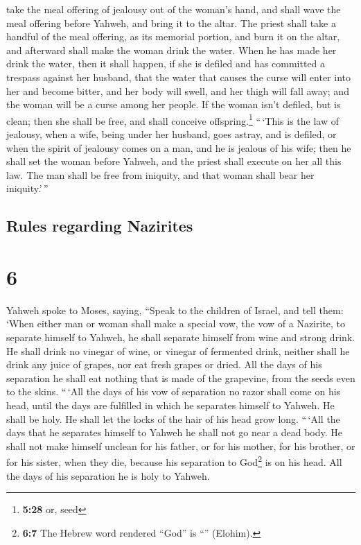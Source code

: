 take the meal offering of jealousy out of the woman's hand, and shall
wave the meal offering before Yahweh, and bring it to the altar.
 The priest shall take a handful of the meal offering, as
its memorial portion, and burn it on the altar, and afterward shall make
the woman drink the water.  When he has made her drink
the water, then it shall happen, if she is defiled and has committed a
trespass against her husband, that the water that causes the curse will
enter into her and become bitter, and her body will swell, and her thigh
will fall away; and the woman will be a curse among her people.
 If the woman isn't defiled, but is clean; then she shall
be free, and shall conceive offspring.\footnote{\textbf{5:28} or, seed}
 ``\,`This is the law of jealousy, when a wife, being
under her husband, goes astray, and is defiled,  or when
the spirit of jealousy comes on a man, and he is jealous of his wife;
then he shall set the woman before Yahweh, and the priest shall execute
on her all this law.  The man shall be free from
iniquity, and that woman shall bear her iniquity.'\,''

\hypertarget{rules-regarding-nazirites}{%
\subsection{Rules regarding Nazirites}\label{rules-regarding-nazirites}}

\hypertarget{section-5}{%
\section{6}\label{section-5}}

 Yahweh spoke to Moses, saying,  ``Speak to
the children of Israel, and tell them: `When either man or woman shall
make a special vow, the vow of a Nazirite, to separate himself to
Yahweh,  he shall separate himself from wine and strong
drink. He shall drink no vinegar of wine, or vinegar of fermented drink,
neither shall he drink any juice of grapes, nor eat fresh grapes or
dried.  All the days of his separation he shall eat
nothing that is made of the grapevine, from the seeds even to the skins.
 ``\,`All the days of his vow of separation no razor shall
come on his head, until the days are fulfilled in which he separates
himself to Yahweh. He shall be holy. He shall let the locks of the hair
of his head grow long.  ``\,`All the days that he
separates himself to Yahweh he shall not go near a dead body.
 He shall not make himself unclean for his father, or for
his mother, for his brother, or for his sister, when they die, because
his separation to God\footnote{\textbf{6:7} The Hebrew word rendered
  ``God'' is ``'' (Elohim).} is on his head.
 All the days of his separation he is holy to Yahweh.

